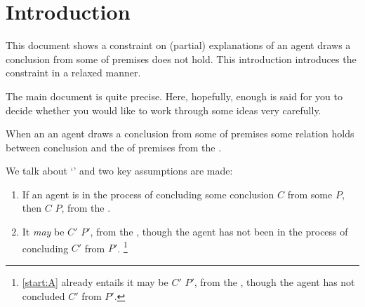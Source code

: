 \chapter{Introduction}
\label{cha:introduction}


\begin{note}
  This document shows a constraint on (partial) explanations of  an agent draws a conclusion from some \pool{} of premises does not hold.
  This introduction introduces the constraint in a relaxed manner.

  The main document is quite precise.
  Here, hopefully, enough is said for you to decide whether you would like to work through some ideas very carefully.
\end{note}


\begin{note}
  When an  an agent draws a conclusion from some \pool{} of premises some relation holds between conclusion and the \pool{} of premises from the \agpe{}.

  We talk about `' and two key assumptions are made:
  \begin{enumerate}[label=\Alph*., ref=(\Alph*)]
  \item
    \label{start:A}
    If an agent is in the process of concluding some conclusion \(C\) from some \pool{} \(P\), then \(C\) \fof{} \(P\), from the \agpe{}.
  \item
    \label{start:B}
    It \emph{may} be \(C'\) \fof{} \(P'\), from the \agpe{}, though the agent has not been in the process of concluding \(C'\) from \(P'\).%
    \footnote{
      \ref{start:A} already entails it may be \(C'\) \fof{} \(P'\), from the \agpe{}, though the agent has not concluded \(C'\) from \(P'\).
    }
  \end{enumerate}
\end{note}

